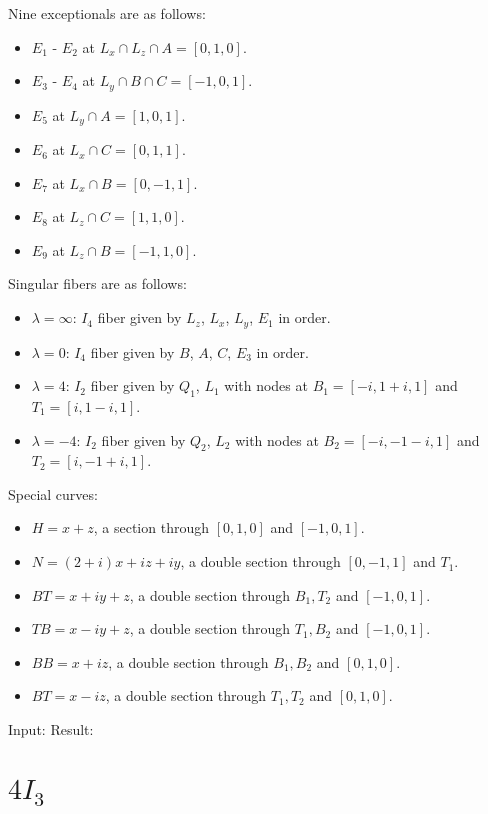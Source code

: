 \documentclass{article}
\begin{document}
Nine exceptionals are as follows:
\begin{itemize}
  \item $E_1$ - $E_2$ at $L_x \cap L_z \cap A = [0,1,0]$.
  \item $E_3$ - $E_4$ at $L_y \cap B \cap C = [-1,0,1]$.
  \item $E_5$ at $L_y \cap A = [1,0,1]$.
  \item $E_6$ at $L_x \cap C = [0,1,1]$.
  \item $E_7$ at $L_x \cap B = [0,-1,1]$.
  \item $E_8$ at $L_z \cap C = [1,1,0]$.
  \item $E_9$ at $L_z \cap B = [-1,1,0]$.
\end{itemize}
Singular fibers are as follows:
\begin{itemize}
  \item $\lambda = \infty$: $I_4$ fiber given by $L_z$, $L_x$, $L_y$, $E_1$ in order.
  \item $\lambda = 0$: $I_4$ fiber given by $B$, $A$, $C$, $E_3$ in order.
  \item $\lambda = 4$: $I_2$ fiber given by $Q_1$, $L_1$ with nodes at $B_1 = [-i,1+i,1]$ and $T_1 = [i,1-i,1]$.
  \item $\lambda = -4$: $I_2$ fiber given by $Q_2$, $L_2$ with nodes at $B_2 = [-i,-1-i,1]$ and $T_2 = [i,-1+i,1]$.
\end{itemize}
Special curves:
\begin{itemize}
  \item $H = x+z$, a section through $[0,1,0]$ and $[-1,0,1]$.
  \item $N = (2+i)x + iz + iy$, a double section through $[0,-1,1]$ and $T_1$.
  \item $BT = x + iy + z$, a double section through $B_1, T_2$ and $[-1,0,1]$.
  \item $TB = x - iy + z$, a double section through $T_1, B_2$ and $[-1,0,1]$.
  \item $BB = x + iz$, a double section through $B_1, B_2$ and $[0,1,0]$.
  \item $BT = x - iz$, a double section through $T_1, T_2$ and $[0,1,0]$.
\end{itemize}

Input:
%
Result:
%




\section{$4I_3$}
\end{document}
